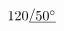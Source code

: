 \documentclass{article}
\newcommand\Angle[1]{\setbox0=\hbox{$\mskip 7mu minus 4mu#1$}%
    \raise.21ex\hbox{$/$}\hskip-0.95ex\underline{\raise\dp0\hbox{\box0}}}
\begin{document}
  $120\Angle{50^{\circ}}$
\end{document}
